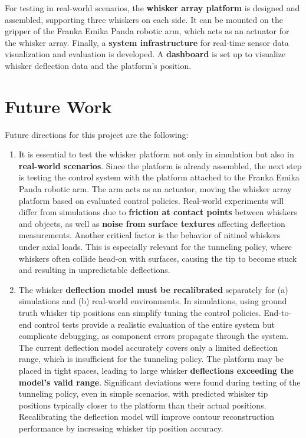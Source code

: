 For testing in real-world scenarios, the \textbf{whisker array platform} is designed and assembled, supporting three whiskers on each side.
It can be mounted on the gripper of the Franka Emika Panda robotic arm, which acts as an actuator for the whisker array.
Finally, a \textbf{system infrastructure} for real-time sensor data visualization and evaluation is developed.
A \textbf{dashboard} is set up to visualize whisker deflection data and the platform's position.


\section{Future Work}
Future directions for this project are the following:
\begin{enumerate}
    \item It is essential to test the whisker platform not only in simulation but also in \textbf{real-world scenarios}.
    Since the platform is already assembled, the next step is testing the control system with the platform attached to the Franka Emika Panda robotic arm.
    The arm acts as an actuator, moving the whisker array platform based on evaluated control policies.
    Real-world experiments will differ from simulations due to \textbf{friction at contact points} between whiskers and objects, as well as \textbf{noise from surface textures} affecting deflection measurements.
    Another critical factor is the behavior of nitinol whiskers under axial loads.
    This is especially relevant for the tunneling policy, where whiskers often collide head-on with surfaces, causing the tip to become stuck and resulting in unpredictable deflections.

    \item The whisker \textbf{deflection model must be recalibrated} separately for (a) simulations and (b) real-world environments.
    In simulations, using ground truth whisker tip positions can simplify tuning the control policies.
    End-to-end control tests provide a realistic evaluation of the entire system but complicate debugging, as component errors propagate through the system.
    The current deflection model accurately covers only a limited deflection range, which is insufficient for the tunneling policy.
    The platform may be placed in tight spaces, leading to large whisker \textbf{deflections exceeding the model's valid range}.
    Significant deviations were found during testing of the tunneling policy, even in simple scenarios, with predicted whisker tip positions typically closer to the platform than their actual positions.
    Recalibrating the deflection model will improve contour reconstruction performance by increasing whisker tip position accuracy.
\end{enumerate}


